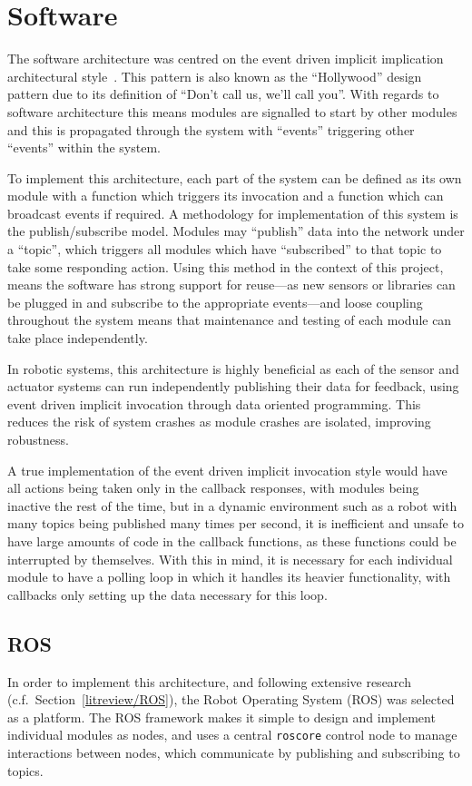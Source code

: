 
\chapter{Software}\label{software}
The software architecture was centred on the event driven implicit implication
architectural style~\cite{garlan1993introduction}. This pattern is
also known as the ``Hollywood'' design pattern due to its definition of ``Don't
call us, we'll call you''. With regards to software architecture this means
modules are signalled to start by other modules and this is propagated through
the system with ``events'' triggering other ``events'' within the system.

To implement this architecture, each part of the system can be defined as its own
module with a function which triggers its invocation and a function which can
broadcast events if required. A methodology for implementation of this system is
the publish/subscribe model. Modules may ``publish'' data into the network under a
``topic'', which triggers all modules which have ``subscribed'' to that topic to
take some responding action. Using this method in the context of this project,
means the software has strong support for reuse---as new sensors or libraries can
be plugged in and subscribe to the appropriate events---and loose coupling
throughout the system means that maintenance and testing of each module can take place independently.

In robotic systems, this architecture is highly beneficial as each of the sensor
and actuator systems can run independently publishing their data for feedback,
using event driven implicit invocation through data oriented programming. This
reduces the risk of system crashes as module crashes are isolated, improving
robustness. 

A true implementation of the event driven implicit invocation style would have all
actions being taken only in the callback responses, with modules being inactive
the rest of the time, but in a dynamic environment such as a robot with many
topics being published many times per second, it is inefficient and unsafe to have
large amounts of code in the callback functions, as these functions could be
interrupted by themselves. With this in mind, it is necessary for each individual
module to have a polling loop in which it handles its heavier functionality, with
callbacks only setting up the data necessary for this loop.

\section{ROS}\label{soft/ROS}
In order to implement this architecture, and following extensive research
(c.f.\ Section~\ref{litreview/ROS}), the Robot Operating System (ROS) was
selected as a platform. The ROS framework makes it simple to design and implement
individual modules as nodes, and uses a central \verb|roscore| control
node to manage interactions between nodes, which communicate by publishing and
subscribing to topics.


